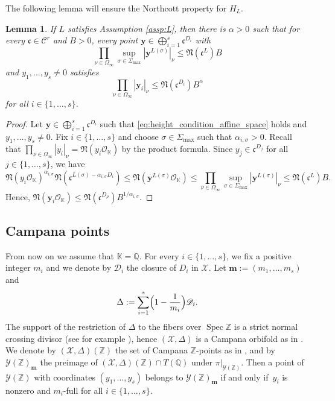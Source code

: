 \documentclass[11pt]{article}
\newcommand{\Subsection}{\subsection}
\numberwithin{equation}{section}
\newcommand{\bfy}{\boldsymbol{y}}
\newcommand{\bfm}{{\boldsymbol{m}}}
\newcommand{\OO}{\mathcal{O}}
\newcommand\ZZ{\mathbb{Z}}
\newcommand\QQ{\mathbb{Q}}
\newcommand{\KK}{\mathbb{K}}
\newcommand{\idealnorm}{\mathfrak{N}}
\DeclareMathOperator{\spec}{Spec}
\newtheorem{lemma}[theorem]{Lemma}
\theoremstyle{definition}
\numberwithin{theorem}{section}
\begin{document}
The following lemma will ensure the Northcott property for $H_L$.

\begin{lemma}
\label{lem:northcott}
If $L$ satisfies Assumption \ref{assp:L},
then there is $\alpha>0$ such that for every
$\mathfrak c\in\mathcal C^r$ and $B>0$, every point
$ \bfy\in \bigoplus_{i=1}^s \mathfrak c^{D_i}$ with
\begin{equation}
\label{eq:height_condition_affine_space}
\prod_{\nu\in\Omega_\infty} \sup_{\sigma\in\Sigma_{\max}} | \bfy^{L(\sigma)}|_{\nu}
\leq \idealnorm(\mathfrak c^{L}) B
\end{equation}
and $y_1,\dots,y_s\neq0$ satisfies
\[
\prod_{\nu\in\Omega_\infty}| \bfy_i|_\nu\leq
\idealnorm(\mathfrak c^{D_{i}})B^\alpha
\]
for all $i\in\{1,\dots,s\}$.
\end{lemma}
\begin{proof}
Let $ \bfy\in \bigoplus_{i=1}^s \mathfrak c^{D_i}$
such that \eqref{eq:height_condition_affine_space} holds
and $y_1,\dots,y_s\neq0$.
Fix $i\in\{1,\dots,s\}$ and choose $\sigma\in \Sigma_{\max}$ such that
$\alpha_{i,\sigma}>0$.
Recall that $\prod_{\nu\in\Omega_\infty}|y_i |_\nu=\idealnorm(y_i \OO_{\KK})$
by the product formula.
Since $y_{j}\in\mathfrak c^{D_{j}}$
for all $j\in\{1,\dots,s\}$, we have
\[
\idealnorm(y_i\OO_{\KK})^{\alpha_{i,\sigma}}
\idealnorm(\mathfrak c^{L(\sigma)-\alpha_{i,\sigma}D_i})
\leq \idealnorm(\bfy^{L(\sigma)}\OO_{\KK})
\leq \prod_{\nu\in\Omega_\infty} \sup_{\sigma\in\Sigma_{\max}} | \bfy^{L(\sigma)} |_{\nu}
\leq \idealnorm(\mathfrak c^{L})B.
\]
Hence, $\idealnorm(\bfy_i\OO_{\KK})
\leq \idealnorm (\mathfrak c^{D_\rho})B^{1/\alpha_{i,\sigma}}$.
\end{proof}

\Subsection{Campana points}
\label{sec:campana}

From now on we assume that $\KK=\QQ$.
For every $i\in\{1,\dots,s\}$, we fix a positive integer $m_i$
and we denote by $\mathscr D_i$ the closure of $D_i$ in $\mathscr X$.
Let $\bfm:=(m_1,\dots,m_s)$ and
\[
\Delta:=\sum_{i=1}^s\Bigl(1-\frac 1{m_i}\Bigr) \mathscr D_i.
\]
The support of the restriction of $\Delta$ to the fibers over $\spec\ZZ$ is a strict
normal crossing divisor (see for example \cite[\S 5.1]{MR2740045}),
hence $(\mathscr{X},\Delta)$ is a Campana orbifold as in \cite[Def.\,3.1]{PSTVA}.
We denote by $(\mathscr{X},\Delta)(\ZZ)$ the set of Campana
$\mathbb Z$-points as in \cite[Def.\,3.4]{PSTVA}, and
by $\mathscr{Y}(\ZZ)_\bfm$ the preimage of
$(\mathscr{X},\Delta)(\ZZ)\cap T(\QQ)$ under $\pi|_{\mathscr{Y}(\ZZ)}$.
Then a point of $\mathscr{Y}(\ZZ)$ with coordinates
$(y_1,\dots,y_s)$ belongs to $\mathscr{Y}(\ZZ)_\bfm$
if and only if~$y_i$ is nonzero and $m_i$-full for all $i\in\{1,\dots,s\}$.
\end{document}
